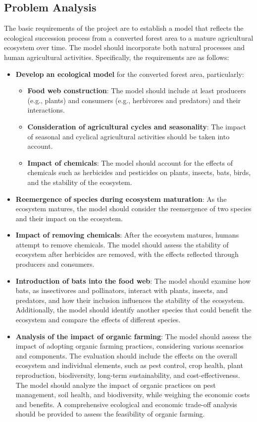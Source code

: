 \documentclass{HZNUMCM}
\begin{document}
    \subsection{Problem Analysis}
      The basic requirements of the project are to establish a model that reflects the ecological succession process from a converted forest area to a mature agricultural ecosystem over time. 
      The model should incorporate both natural processes and human agricultural activities. 
      Specifically, the requirements are as follows:
      \begin{itemize}
        \item \textbf{Develop an ecological model} for the converted forest area, particularly:
          \begin{itemize}
            \item \textbf{Food web construction}: The model should include at least producers (e.g., plants) and consumers (e.g., herbivores and predators) and their interactions.
            \item \textbf{Consideration of agricultural cycles and seasonality}: The impact of seasonal and cyclical agricultural activities should be taken into account.
            \item \textbf{Impact of chemicals}: The model should account for the effects of chemicals such as herbicides and pesticides on plants, insects, bats, birds, and the stability of the ecosystem.
          \end{itemize}
        \item \textbf{Reemergence of species during ecosystem maturation}: As the ecosystem matures, the model should consider the reemergence of two species and their impact on the ecosystem.
        \item \textbf{Impact of removing chemicals}: After the ecosystem matures, humans attempt to remove chemicals. The model should assess the stability of ecosystem after herbicides are removed, with the effects reflected through producers and consumers.
        \item \textbf{Introduction of bats into the food web}: The model should examine how bats, as insectivores and pollinators, interact with plants, insects, and predators, and how their inclusion influences the stability of the ecosystem. Additionally, the model should identify another species that could benefit the ecosystem and compare the effects of different species.
        \item \textbf{Analysis of the impact of organic farming}: The model should assess the impact of adopting organic farming practices, considering various scenarios and components. The evaluation should include the effects on the overall ecosystem and individual elements, such as pest control, crop health, plant reproduction, biodiversity, long-term sustainability, and cost-effectiveness. The model should analyze the impact of organic practices on pest management, soil health, and biodiversity, while weighing the economic costs and benefits. A comprehensive ecological and economic trade-off analysis should be provided to assess the feasibility of organic farming.
      \end{itemize}
\end{document}
